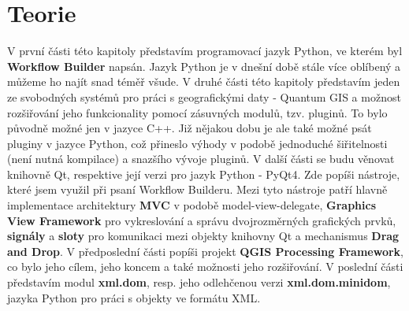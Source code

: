 \chapter{Teorie}
V první části této kapitoly představím programovací jazyk Python, ve
kterém byl \textbf{Workflow Builder} napsán. Jazyk Python je v dnešní
době stále více oblíbený a můžeme ho najít snad téměř všude. V druhé
části této kapitoly představím jeden ze svobodných systémů pro práci s
geografickými daty - Quantum GIS a možnost rozšiřování jeho
funkcionality pomocí zásuvných modulů, tzv. pluginů. To bylo původně
možné jen v jazyce C++. Již nějakou dobu je ale také možné psát
pluginy v jazyce Python, což přineslo výhody v podobě jednoduché
šiřitelnosti (není nutná kompilace) a snazšího vývoje pluginů. V další
části se budu věnovat knihovně Qt, respektive její verzi pro jazyk
Python - PyQt4. Zde popíši nástroje, které jsem využil při psaní
Workflow Builderu. Mezi tyto nástroje patří hlavně implementace
architektury \textbf{MVC} v podobě model-view-delegate,
\textbf{Graphics View Framework} pro vykreslování a správu
dvojrozměrných grafických prvků, \textbf{signály} a \textbf{sloty} pro
komunikaci mezi objekty knihovny Qt a mechanismus \textbf{Drag and
  Drop}. V předposlední části popíši projekt \textbf{QGIS Processing
  Framework}, co bylo jeho cílem, jeho koncem a také možnosti jeho
rozšiřování.  V poslední části představím modul \textbf{xml.dom},
resp. jeho odlehčenou verzi \textbf{xml.dom.minidom}, jazyka Python
pro práci s objekty ve formátu XML.

\newpage





